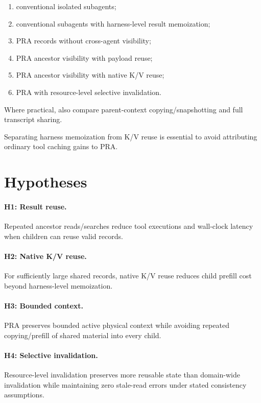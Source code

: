 \documentclass[11pt]{article}
\begin{document}
\begin{enumerate}[leftmargin=*]
    \item conventional isolated subagents;
    \item conventional subagents with harness-level result memoization;
    \item PRA records without cross-agent visibility;
    \item PRA ancestor visibility with payload reuse;
    \item PRA ancestor visibility with native K/V reuse;
    \item PRA with resource-level selective invalidation.
\end{enumerate}

Where practical, also compare parent-context copying/snapshotting and full transcript sharing.

Separating harness memoization from K/V reuse is essential to avoid attributing ordinary tool caching gains to PRA.

\section{Hypotheses}

\paragraph{H1: Result reuse.}
Repeated ancestor reads/searches reduce tool executions and wall-clock latency when children can reuse valid records.

\paragraph{H2: Native K/V reuse.}
For sufficiently large shared records, native K/V reuse reduces child prefill cost beyond harness-level memoization.

\paragraph{H3: Bounded context.}
PRA preserves bounded active physical context while avoiding repeated copying/prefill of shared material into every child.

\paragraph{H4: Selective invalidation.}
Resource-level invalidation preserves more reusable state than domain-wide invalidation while maintaining zero stale-read errors under stated consistency assumptions.
\end{document}
